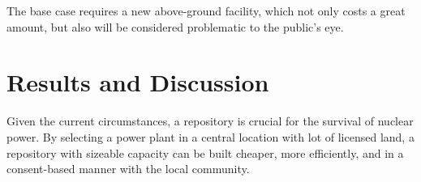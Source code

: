 The base case requires a new above-ground facility, which not only costs a great
amount, but also will be considered problematic to the public's eye. 


\section{Results and Discussion} 
Given the current circumstances, a repository is crucial for the survival of nuclear
power. By selecting a power plant in a central location with lot of licensed land,
a repository with sizeable capacity can be built cheaper, more efficiently, and 
in a consent-based manner with the local community. 
